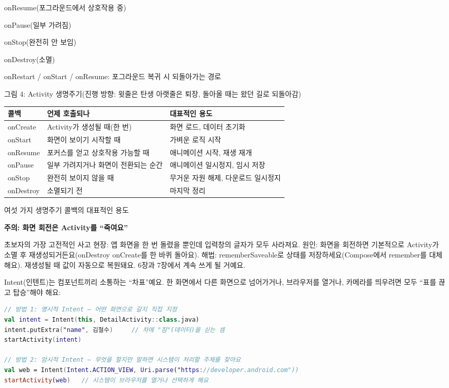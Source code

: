 onResume(포그라운드에서 상호작용 중)

onPause(일부 가려짐)

onStop(완전히 안 보임)

onDestroy(소멸)

onRestart / onStart / onResume: 포그라운드 복귀 시 되돌아가는 경로

\begin{center}\small\color{gray}그림 4: Activity 생명주기(진행 방향: 윗줄은 탄생 아랫줄은 퇴장, 돌아올 때는 왔던 길로 되돌아감)\end{center}

\begin{center}
\begin{tabularx}{\linewidth}{|X|X|X|}
\hline
\textbf{콜백} & \textbf{언제 호출되나} & \textbf{대표적인 용도} \tabularnewline
\hline
onCreate & Activity가 생성될 때(한 번) & 화면 로드, 데이터 초기화 \tabularnewline
onStart & 화면이 보이기 시작할 때 & 가벼운 로직 시작 \tabularnewline
onResume & 포커스를 얻고 상호작용 가능할 때 & 애니메이션 시작, 재생 재개 \tabularnewline
onPause & 일부 가려지거나 화면이 전환되는 순간 & 애니메이션 일시정지, 임시 저장 \tabularnewline
onStop & 완전히 보이지 않을 때 & 무거운 자원 해제, 다운로드 일시정지 \tabularnewline
onDestroy & 소멸되기 전 & 마지막 정리 \tabularnewline
\hline
\end{tabularx}
\end{center}

\begin{center}\small\color{gray}여섯 가지 생명주기 콜백의 대표적인 용도\end{center}

\textbf{주의: 화면 회전은 Activity를 “죽여요”}\par

초보자의 가장 고전적인 사고 현장: 앱 화면을 한 번 돌렸을 뿐인데 입력창의 글자가 모두 사라져요. 원인: 화면을 회전하면 기본적으로 Activity가 소멸 후 재생성되거든요(onDestroy onCreate를 한 바퀴 돌아요). 해법: rememberSaveable로 상태를 저장하세요(Compose에서 remember를 대체해요). 재생성될 때 값이 자동으로 복원돼요. 6장과 7장에서 계속 쓰게 될 거예요.


Intent(인텐트)는 컴포넌트끼리 소통하는 “차표”예요. 한 화면에서 다른 화면으로 넘어가거나, 브라우저를 열거나, 카메라를 띄우려면 모두 “표를 끊고 탑승”해야 해요:

\begin{lstlisting}[language=Kotlin]
// 방법 1: 명시적 Intent — 어떤 화면으로 갈지 직접 지정
val intent = Intent(this, DetailActivity::class.java)
intent.putExtra("name", 김철수)     // 차에 "짐"(데이터)을 싣는 셈
startActivity(intent)

// 방법 2: 암시적 Intent — 무엇을 할지만 말하면 시스템이 처리할 주체를 찾아요
val web = Intent(Intent.ACTION_VIEW, Uri.parse("https://developer.android.com"))
startActivity(web)   // 시스템이 브라우저를 열거나 선택하게 해요
\end{lstlisting}

